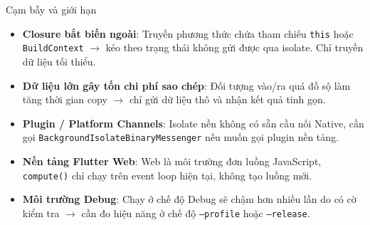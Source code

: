 \documentclass[aspectratio=169,11pt]{beamer}
\begin{document}
\begin{frame}{Cạm bẫy và giới hạn}
  \begin{itemize}
    \setlength{\itemsep}{0.22cm}
    \item \textbf{Closure bắt biến ngoài}: Truyền phương thức chứa tham chiếu \texttt{this} hoặc \texttt{BuildContext} $\rightarrow$ kéo theo trạng thái không gửi được qua isolate. Chỉ truyền dữ liệu tối thiểu.
    \item \textbf{Dữ liệu lớn gây tốn chi phí sao chép}: Đối tượng vào/ra quá đồ sộ làm tăng thời gian copy $\rightarrow$ chỉ gửi dữ liệu thô và nhận kết quả tinh gọn.
    \item \textbf{Plugin / Platform Channels}: Isolate nền không có sẵn cầu nối Native, cần gọi \texttt{BackgroundIsolateBinaryMessenger} nếu muốn gọi plugin nền tảng.
    \item \textbf{Nền tảng Flutter Web}: Web là môi trường đơn luồng JavaScript, \texttt{compute()} chỉ chạy trên event loop hiện tại, không tạo luồng mới.
    \item \textbf{Môi trường Debug}: Chạy ở chế độ Debug sẽ chậm hơn nhiều lần do có cờ kiểm tra $\rightarrow$ cần đo hiệu năng ở chế độ \texttt{--profile} hoặc \texttt{--release}.
  \end{itemize}
\end{frame}

\end{document}
